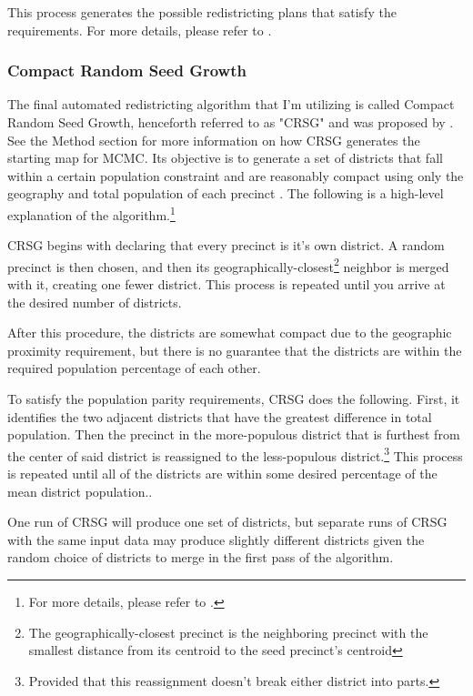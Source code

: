 This process generates the possible redistricting plans that satisfy the requirements. For more details, please refer to \textcite{mccartan2020}.

\subsubsection{Compact Random Seed Growth}
\label{sec:crsg}

The final automated redistricting algorithm that I'm utilizing is called Compact Random Seed Growth, henceforth referred to as "CRSG" and was proposed by \textcite{chen2013}. See the Method section for more information on how CRSG generates the starting map for MCMC. Its objective is to generate a set of districts that fall within a certain population constraint and are reasonably compact using only the geography and total population of each precinct \parencite{chen2013}. The following is a high-level explanation of the algorithm.\footnote{For more details, please refer to \textcite[249-50]{chen2013}.} 

CRSG begins with declaring that every precinct is it's own district. A random precinct is then chosen, and then its geographically-closest\footnote{The geographically-closest precinct is the neighboring precinct with the smallest distance from its centroid to the seed precinct's centroid} neighbor is merged with it, creating one fewer district. This process is repeated until you arrive at the desired number of districts. \parencite[249-50]{chen2013}

After this procedure, the districts are somewhat compact due to the geographic proximity requirement, but there is no guarantee that the districts are within the required population percentage of each other. 

To satisfy the population parity requirements, CRSG does the following. First, it identifies the two adjacent districts that have the greatest difference in total population. Then the precinct in the more-populous district that is furthest from the center of said district is reassigned to the less-populous district.\footnote{Provided that this reassignment doesn't break either district into parts.} This process is repeated until all of the districts are within some desired percentage of the mean district population.\textcite[249-50]{chen2013}.

One run of CRSG will produce one set of districts, but separate runs of CRSG with the same input data may produce slightly different districts given the random choice of districts to merge in the first pass of the algorithm. 

